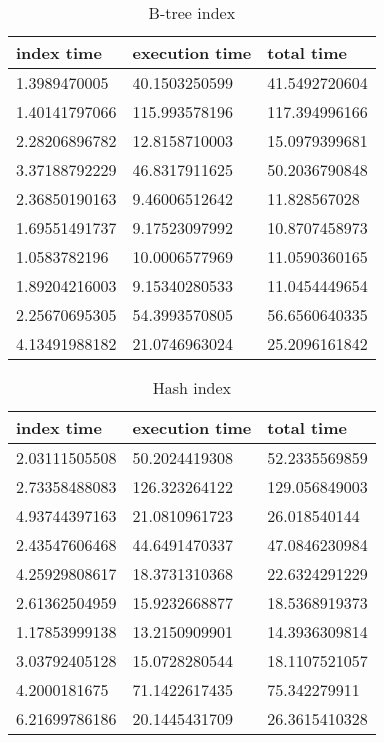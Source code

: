 \begin{itemize*}
\begin{table}[H]
\begin{center}
\begin{tabular}{|l|l|l|}
\hline
index time & execution time & total time                \\ \hline
1.3989470005  & 40.1503250599 & 41.5492720604 \\ \hline
1.40141797066 & 115.993578196 & 117.394996166 \\ \hline
2.28206896782 & 12.8158710003 & 15.0979399681 \\ \hline
3.37188792229 & 46.8317911625 & 50.2036790848 \\ \hline
2.36850190163 & 9.46006512642 & 11.828567028  \\ \hline
1.69551491737 & 9.17523097992 & 10.8707458973 \\ \hline
1.0583782196  & 10.0006577969 & 11.0590360165 \\ \hline
1.89204216003 & 9.15340280533 & 11.0454449654 \\ \hline
2.25670695305 & 54.3993570805 & 56.6560640335 \\ \hline
4.13491988182 & 21.0746963024 & 25.2096161842 \\ \hline
\end{tabular}
\end{center}
\caption{B-tree index}
\end{table}

\begin{table}[H]
\begin{center}
\begin{tabular}{|l|l|l|}
\hline
index time & execution time & total time     \\ \hline
2.03111505508 & 50.2024419308 & 52.2335569859 \\ \hline
2.73358488083 & 126.323264122 & 129.056849003 \\ \hline
4.93744397163 & 21.0810961723 & 26.018540144  \\ \hline
2.43547606468 & 44.6491470337 & 47.0846230984 \\ \hline
4.25929808617 & 18.3731310368 & 22.6324291229 \\ \hline
2.61362504959 & 15.9232668877 & 18.5368919373 \\ \hline
1.17853999138 & 13.2150909901 & 14.3936309814 \\ \hline
3.03792405128 & 15.0728280544 & 18.1107521057 \\ \hline
4.2000181675  & 71.1422617435 & 75.342279911  \\ \hline
6.21699786186 & 20.1445431709 & 26.3615410328 \\ \hline
\end{tabular}
\end{center}
\caption{Hash index}
\end{table}


\end{itemize*}
